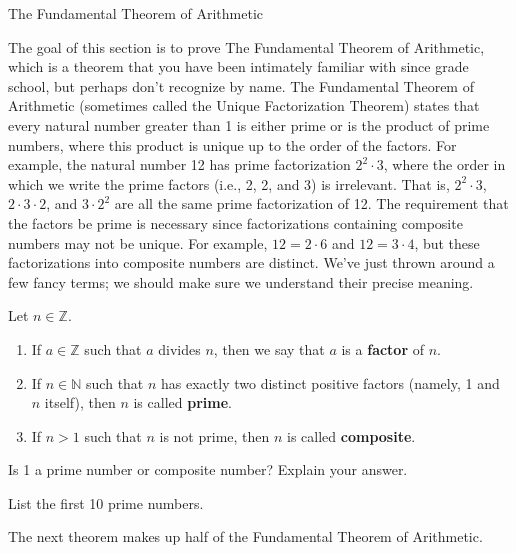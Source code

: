 \begin{section}{The Fundamental Theorem of Arithmetic}

The goal of this section is to prove The Fundamental Theorem of Arithmetic, which is a theorem that you have been intimately familiar with since grade school, but perhaps don't recognize by name.  The Fundamental Theorem of Arithmetic (sometimes called the Unique Factorization Theorem) states that every natural number greater than 1 is either prime or is the product of prime numbers, where this product is unique up to the order of the factors. For example, the natural number 12 has prime factorization $2^2\cdot 3$, where the order in which we write the prime factors (i.e., 2, 2, and 3) is irrelevant. That is, $2^2\cdot 3$, $2\cdot 3\cdot2$, and $3\cdot 2^2$ are all the same prime factorization of 12. The requirement that the factors be prime is necessary since factorizations containing composite numbers may not be unique. For example, $12=2\cdot 6$ and $12=3\cdot 4$, but these factorizations into composite numbers are distinct. We've just thrown around a few fancy terms; we should make sure we understand their precise meaning.

\begin{definition}
Let $n\in\mathbb{Z}$.
\begin{enumerate}[label=\textrm{(\alph*)}]
\item If $a\in \mathbb{Z}$ such that $a$ divides $n$, then we say that $a$ is a \textbf{factor} of $n$.
\item If $n\in \mathbb{N}$ such that $n$ has exactly two distinct positive factors (namely, 1 and $n$ itself), then $n$ is called \textbf{prime}.
\item If $n>1$ such that $n$ is not prime, then $n$ is called \textbf{composite}.
\end{enumerate}
\end{definition}

\begin{exercise}
Is 1 a prime number or composite number?  Explain your answer.
\end{exercise}

\begin{exercise}
List the first 10 prime numbers.
\end{exercise}

The next theorem makes up half of the Fundamental Theorem of Arithmetic.


\end{section}
